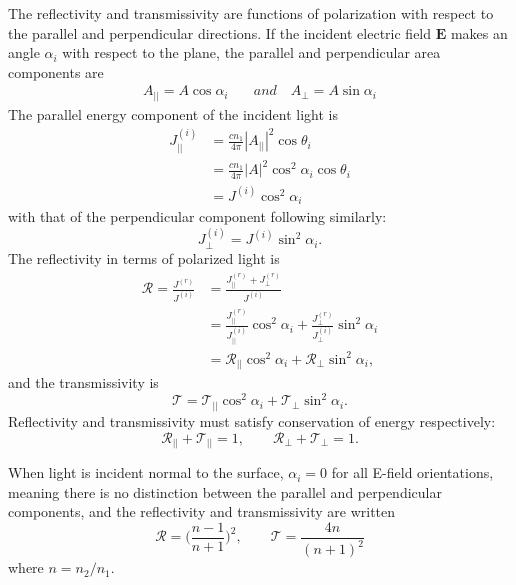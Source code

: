 The reflectivity and transmissivity are functions of polarization with respect to the parallel and perpendicular directions. If the incident electric field $\mathbf{E}$ makes an angle $\alpha_i$ with respect to the plane, the parallel and perpendicular area components are
%
\begin{align}
    A_{||} = A \cos{\alpha_i} & \quad and \quad A_{\perp} = A \sin{\alpha_i}
\end{align}
%
The parallel energy component of the incident light is
%
\begin{align}
    J_{||}^{(i)} &= \frac{cn_1}{4\pi} |A_{||}|^2 \cos{\theta_i} \nonumber \\
    &= \frac{cn_1}{4\pi} |A |^2 \cos^2{\alpha_i} \cos{\theta_i} \nonumber \\
    &= J^{(i)} \cos^2{\alpha_i}
\end{align}
%
with that of the perpendicular component following similarly:
%
\begin{equation}
    J_{\perp}^{(i)} = J^{(i)} \sin^2{\alpha_i}.
\end{equation}
%
The reflectivity in terms of polarized light is
%
\begin{align}
    \mathcal{R} = \frac{J^{(r)}}{J^{(i)}} &= \frac{J_{||}^{(r)} + J_{\perp}^{(r)}}{J^{(i)}} \nonumber \\
    &= \frac{J_{||}^{(r)}}{J_{||}^{(i)}} \cos^2{\alpha_i} + \frac{J_{\perp}^{(r)}}{J_{\perp}^{(i)}} \sin^2{\alpha_i} \nonumber \\
    &= \mathcal{R}_{||} \cos^2{\alpha_i} + \mathcal{R}_{\perp} \sin^2{\alpha_i},
\end{align}
%
and the transmissivity is
%
\begin{equation}
    \mathcal{T} = \mathcal{T}_{||} \cos^2{\alpha_i} + \mathcal{T}_{\perp} \sin^2{\alpha_i}.
\end{equation}
%
Reflectivity and transmissivity must satisfy conservation of energy respectively:
%
\begin{equation}
    \mathcal{R}_{||} + \mathcal{T}_{||} = 1, \qquad \mathcal{R}_{\perp} + \mathcal{T}_{\perp} = 1.
\end{equation}

When light is incident normal to the surface, $\alpha_i = 0$ for all E-field orientations, meaning there is no distinction between the parallel and perpendicular components, and the reflectivity and transmissivity are written
%
\begin{equation}
    \mathcal{R} = \bigg(\frac{n - 1}{n+1} \bigg)^2, \qquad \mathcal{T} = \frac{4n}{(n + 1)^2}
\end{equation}
%
where $n = n_2 / n_1$.

